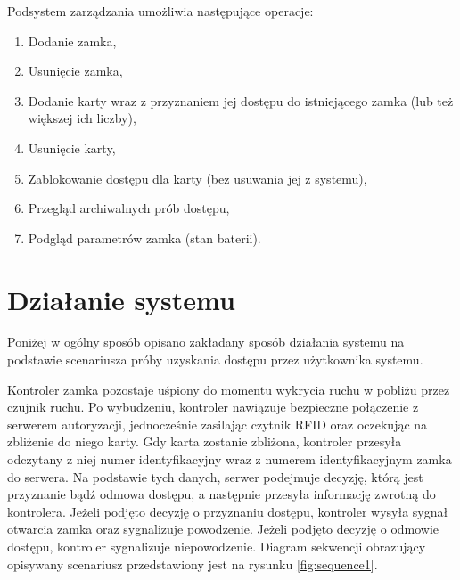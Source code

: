                                 Podsystem zarządzania umożliwia następujące operacje:
                                \begin{enumerate}
                                        \item Dodanie zamka,
                                        \item Usunięcie zamka,
                                        \item Dodanie karty wraz z przyznaniem jej dostępu do istniejącego zamka (lub też większej ich liczby),
                                        \item Usunięcie karty,
                                        \item Zablokowanie dostępu dla karty (bez usuwania jej z systemu),
                                        \item Przegląd archiwalnych prób dostępu,
                                        \item Podgląd parametrów zamka (stan baterii).
                                \end{enumerate}

        \section{Działanie systemu}
                Poniżej w ogólny sposób opisano zakładany sposób działania systemu na podstawie scenariusza próby uzyskania dostępu przez użytkownika systemu.

                Kontroler zamka pozostaje uśpiony do momentu wykrycia ruchu w pobliżu przez czujnik ruchu. Po wybudzeniu, kontroler nawiązuje bezpieczne połączenie z serwerem autoryzacji, jednocześnie zasilając czytnik RFID oraz oczekując na zbliżenie do niego karty. Gdy karta zostanie zbliżona, kontroler przesyła odczytany z niej numer identyfikacyjny wraz z numerem identyfikacyjnym zamka do serwera. Na podstawie tych danych, serwer podejmuje decyzję, którą jest przyznanie bądź odmowa dostępu, a następnie przesyła informację zwrotną do kontrolera. Jeżeli podjęto decyzję o przyznaniu dostępu, kontroler wysyła sygnał otwarcia zamka oraz sygnalizuje powodzenie. Jeżeli podjęto decyzję o odmowie dostępu, kontroler sygnalizuje niepowodzenie. Diagram sekwencji obrazujący opisywany scenariusz przedstawiony jest na rysunku \ref{fig:sequence1}.

